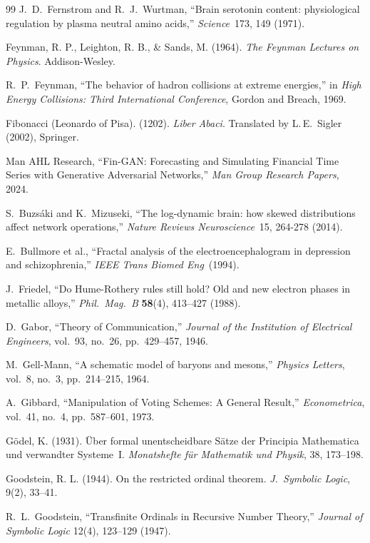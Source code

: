 \begin{thebibliography}{99}
 J.~D.~Fernstrom and R.~J.~Wurtman, ``Brain serotonin content: physiological regulation by plasma neutral amino acids,'' \emph{Science}\ 173, 149 (1971).

 Feynman, R. P., Leighton, R. B., \& Sands, M. (1964). \emph{The Feynman Lectures on Physics}. Addison-Wesley.

R.~P.~Feynman, ``The behavior of hadron collisions at extreme energies,'' in \emph{High Energy Collisions: Third International Conference}, Gordon and Breach, 1969.

 Fibonacci (Leonardo of Pisa). (1202). \emph{Liber Abaci}. Translated by L.\,E.\ Sigler (2002), Springer.

Man AHL Research,
``Fin-GAN: Forecasting and Simulating Financial Time Series with Generative Adversarial Networks,''
\emph{Man Group Research Papers}, 2024.

 S.~Buzs\'aki and K.~Mizuseki, ``The log-dynamic brain: how skewed distributions affect network operations,'' \emph{Nature Reviews Neuroscience}\ 15, 264-278 (2014).

 E.~Bullmore et al., ``Fractal analysis of the electroencephalogram in depression and schizophrenia,'' \emph{IEEE Trans Biomed Eng}\ (1994).

J.~Friedel,
``Do Hume-Rothery rules still hold? Old and new electron phases in metallic alloys,''
\emph{Phil.~Mag.~B} \textbf{58}(4), 413--427 (1988).

D.~Gabor,
``Theory of Communication,''
\emph{Journal of the Institution of Electrical Engineers}, vol.~93, no.~26, pp.~429--457, 1946.

M.~Gell-Mann, ``A schematic model of baryons and mesons,'' \emph{Physics Letters}, vol.~8, no.~3, pp.~214--215, 1964.

A.~Gibbard,
``Manipulation of Voting Schemes: A General Result,''
\emph{Econometrica}, vol.~41, no.~4, pp.~587--601, 1973.

 G\"odel, K. (1931). \"Uber formal unentscheidbare S\"atze der Principia Mathematica und verwandter Systeme~I. \emph{Monatshefte f\"ur Mathematik und Physik}, 38, 173--198.

 Goodstein, R. L. (1944). On the restricted ordinal theorem. \emph{J.\ Symbolic Logic}, 9(2), 33--41.

R.~L.~Goodstein,
``Transfinite Ordinals in Recursive Number Theory,''
\emph{Journal of Symbolic Logic} 12(4), 123--129 (1947).


\end{thebibliography}
